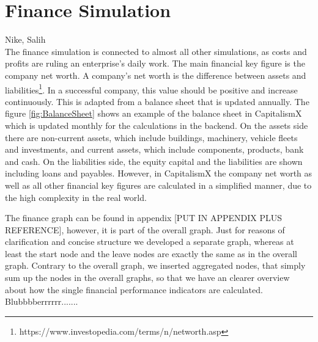 \section{Finance Simulation}
\label{sec:finance_simulation}
Nike, Salih\\

The finance simulation is connected to almost all other simulations, as costs and profits are ruling an enterprise's daily work. The main financial key figure is the company net worth. A company's net worth is the difference between assets and liabilities\footnote{https://www.investopedia.com/terms/n/networth.asp}. In a successful company, this value should be positive and increase continuously. This is adapted from a balance sheet that is updated annually. The figure \ref{fig:BalanceSheet} shows an example of the balance sheet in CapitalismX which is updated monthly for the calculations in the backend. On the assets side there are non-current assets, which include buildings, machinery, vehicle fleets and investments, and current assets, which include components, products, bank and cash. On the liabilities side, the equity capital and the liabilities are shown including loans and payables. However, in CapitalismX the company net worth as well as all other financial key figures are calculated in a simplified manner, due to the high complexity in the real world.

The finance graph can be found in appendix [PUT IN APPENDIX PLUS REFERENCE], however, it is part of the overall graph. Just for reasons of clarification and concise structure we developed a separate graph, whereas at least the start node and the leave nodes are exactly the same as in the overall graph. Contrary to the overall graph, we inserted aggregated nodes, that simply sum up the nodes in the overall graphs, so that we have an clearer overview about how the single financial performance indicators are calculated. Blubbbberrrrrr.......


